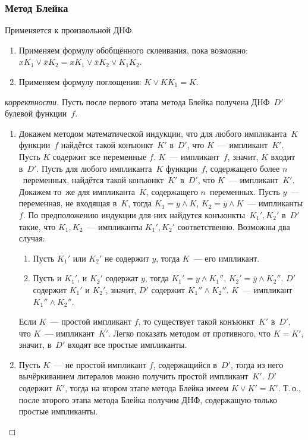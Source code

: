 \subsubsection{Метод Блейка}
Применяется к произвольной ДНФ.
\begin{enumerate}
	\item Применяем формулу обобщённого склеивания, пока возможно: $x K_1 \lor \overline x K_2 =
	x K_1 \lor \overline x K_2 \lor K_1 K_2$.
	
	\item Применяем формулу поглощения: $K \lor K K_1 = K$.
\end{enumerate}
\begin{proof}[корректности]
Пусть после первого этапа метода Блейка получена ДНФ~$D'$ булевой функции~$f$.
\begin{enumerate}
	\item Докажем методом математической индукции, что для любого импликанта~$K$ функции~$f$ найдётся такой конъюнкт~$K'$ в~$D'$, что $K$~--- импликант~$K'$.
		\indbase Пусть $K$ содержит все переменные $f$.
		$K$~--- импликант~$f$, значит, $K$ входит в~$D'$.
		\indstep Пусть для любого импликанта~$K$ функции~$f$, содержащего более $n$~переменных, найдётся такой конъюнкт~$K'$ в~$D'$, что $K$~--- импликант~$K'$.
		Докажем то~же для импликанта~$K$, содержащего $n$~переменных.
		Пусть $y$~--- переменная, не входящая в~$K$, тогда $K_1 = y \land K$, $K_2 = \overline y \land K$~--- импликанты $f$.
		По предположению индукции для них найдутся конъюнкты~$K_1', K_2'$ в~$D'$ такие, что $K_1, K_2$~--- импликанты $K_1', K_2'$ соответственно.
		Возможны два случая:
		\begin{enumerate}
			\item Пусть $K_1'$ или $K_2'$ не содержит $y$, тогда $K$~--- его импликант.
			\item Пусть и $K_1'$, и $K_2'$ содержат $y$, тогда $K_1' = y \land K_1''$, $K_2' = \overline y \land K_2''$.
			$D'$ содержит $K_1'$ и $K_2'$, значит, $D'$ содержит $K_1'' \land K_2''$.
			$K$~--- импликант $K_1'' \land K_2''$.
		\end{enumerate}
		\indend
	
	Если $K$~--- простой импликант $f$, то существует такой конъюнкт~$K'$ в~$D'$, что $K$~--- импликант~$K'$.
	Легко показать методом от противного, что $K = K'$, значит, в~$D'$ входят все простые импликанты.
	
	\item Пусть $K$~--- не простой импликант $f$, содержащийся в~$D'$, тогда из него вычёркиванием литералов можно получить простой импликант~$K'$.
	$D'$ содержит $K'$, тогда на втором этапе метода Блейка имеем $K \lor K' = K'$.
	Т.\,о., после второго этапа метода Блейка получим ДНФ, содержащую только простые импликанты.
\end{enumerate}
\end{proof}

